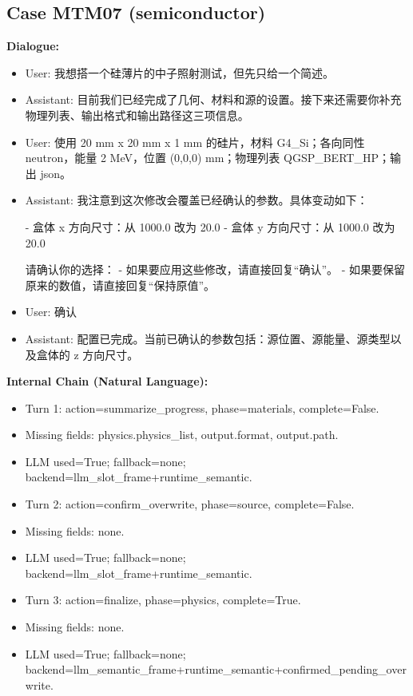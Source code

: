 \documentclass[11pt]{ctexart}
\begin{document}
\subsection{Case MTM07 (semiconductor)}
\textbf{Dialogue:}
\begin{itemize}
\item User: 我想搭一个硅薄片的中子照射测试，但先只给一个简述。
\item Assistant: 目前我们已经完成了几何、材料和源的设置。接下来还需要你补充物理列表、输出格式和输出路径这三项信息。
\item User: 使用 20 mm x 20 mm x 1 mm 的硅片，材料 G4\_Si；各向同性 neutron，能量 2 MeV，位置 (0,0,0) mm；物理列表 QGSP\_BERT\_HP；输出 json。
\item Assistant: 我注意到这次修改会覆盖已经确认的参数。具体变动如下：

- 盒体 x 方向尺寸：从 1000.0 改为 20.0
- 盒体 y 方向尺寸：从 1000.0 改为 20.0

请确认你的选择：
- 如果要应用这些修改，请直接回复“确认”。
- 如果要保留原来的数值，请直接回复“保持原值”。
\item User: 确认
\item Assistant: 配置已完成。当前已确认的参数包括：源位置、源能量、源类型以及盒体的 z 方向尺寸。
\end{itemize}
\textbf{Internal Chain (Natural Language):}
\begin{itemize}
\item Turn 1: action=summarize\_progress, phase=materials, complete=False.
\item Missing fields: physics.physics\_list, output.format, output.path.
\item LLM used=True; fallback=none; backend=llm\_slot\_frame+runtime\_semantic.
\item Turn 2: action=confirm\_overwrite, phase=source, complete=False.
\item Missing fields: none.
\item LLM used=True; fallback=none; backend=llm\_slot\_frame+runtime\_semantic.
\item Turn 3: action=finalize, phase=physics, complete=True.
\item Missing fields: none.
\item LLM used=True; fallback=none; backend=llm\_semantic\_frame+runtime\_semantic+confirmed\_pending\_overwrite.
\end{itemize}
\end{document}
